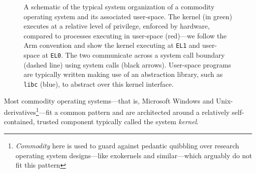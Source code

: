 \documentclass[a4paper, UKenglish, cleveref, autoref, thm-restate]{lipics-v2021}
\begin{document}
\begin{figure}
\caption{A schematic of the typical system organization of a commodity operating system and its associated user-space.
The kernel (in green) executes at a relative level of privilege, enforced by hardware, compared to processes executing in user-space (red)---we follow the Arm convention and show the kernel executing at \texttt{EL1} and user-space at \texttt{EL0}.
The two communicate across a system call boundary (dashed line) using system calls (black arrows).
User-space programs are typically written making use of an abstraction library, such as \texttt{libc} (blue), to abstract over this kernel interface.}
\label{fig.operating-system.schematic}
\end{figure}

Most commodity operating systems---that is, Microsoft Windows and Unix-derivatives\footnote{\emph{Commodity} here is used to guard against pedantic quibbling over research operating system designs---like exokernels and similar---which arguably do not fit this pattern}---fit a common pattern and are architected around a relatively self-contained, trusted component typically called the system \emph{kernel}.
\end{document}
